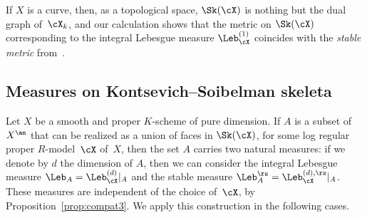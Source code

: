 If $X$ is a curve, then, as a topological space, $\Sk(\cX)$ is nothing but the dual graph of~$\cX_k$, and our calculation shows that the metric on $\Sk(\cX)$ corresponding to the integral Lebesgue measure $\Leb^{(1)}_{\cX}$ coincides with the {\em stable metric} from~\cite[A.1]{BaNi}.

\subsection{Measures on Kontsevich--Soibelman skeleta}
Let $X$ be a smooth and proper $K$\nobreakdash-scheme of pure dimension.
If $A$ is a subset of $X^{\an}$ that can be realized as a union of faces in $\Sk(\cX)$, for some log regular proper $R$\nobreakdash-model~$\cX$ of~$X$, then the set $A$ carries two natural measures: if we denote by $d$ the dimension of $A$, then we can consider the integral Lebesgue measure $\Leb_A=\Leb^{(d)}_{\cX}|_A$ and the stable measure $\Leb^{\rs}_A=\Leb^{(d),\rs}_{\cX}|_A$. These measures are independent of the choice of~$\cX$, by Proposition~\ref{prop:compat3}. We apply this construction in the following cases.

